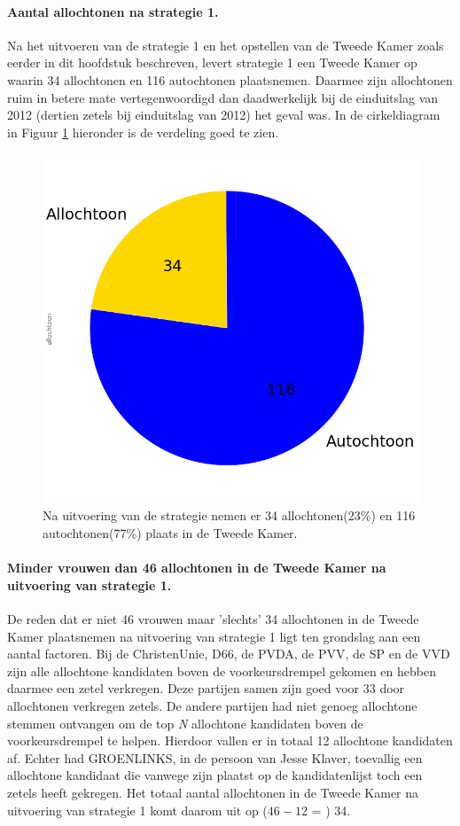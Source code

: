 \paragraph{Aantal allochtonen na strategie 1.}
Na het uitvoeren van de strategie 1 en het opstellen van de Tweede Kamer zoals eerder in dit hoofdstuk beschreven, levert strategie 1 een Tweede Kamer op waarin 34 allochtonen en 116 autochtonen plaatsnemen. Daarmee zijn allochtonen ruim in betere mate vertegenwoordigd dan daadwerkelijk bij de einduitslag van 2012 (dertien zetels bij einduitslag van 2012) het geval was. In de cirkeldiagram in Figuur \ref{fig:pcS1A} hieronder is de verdeling goed te zien. 

\begin{figure}[H]
\centering
	\includegraphics[width=0.35\linewidth]{pie_chart_topN_allochtonen.png}

			\caption{Na uitvoering van de strategie nemen er 34 allochtonen(23\%) en 116 autochtonen(77\%) plaats in de Tweede Kamer.} 

\label{fig:pcS1A}
\end{figure}

\paragraph{Minder vrouwen dan 46 allochtonen in de Tweede Kamer na uitvoering van strategie 1.}
De reden dat er niet 46 vrouwen maar 'slechts' 34 allochtonen in de Tweede Kamer plaatsnemen na uitvoering van strategie 1 ligt ten grondslag aan een aantal factoren. Bij de ChristenUnie, D66, de PVDA, de PVV, de SP en de VVD zijn alle allochtone kandidaten boven de voorkeursdrempel gekomen en hebben daarmee een zetel verkregen. Deze partijen samen zijn goed voor 33 door allochtonen verkregen zetels. De andere partijen had niet genoeg allochtone stemmen ontvangen om de top \textit{N} allochtone kandidaten boven de voorkeursdrempel te helpen. Hierdoor vallen er in totaal 12 allochtone kandidaten af. Echter had GROENLINKS, in de persoon van Jesse Klaver, toevallig een allochtone kandidaat die vanwege zijn plaatst op de kandidatenlijst toch een zetels heeft gekregen.
Het totaal aantal allochtonen in de Tweede Kamer na uitvoering van strategie 1 komt daarom uit op ($46-12$ = ) 34. 


